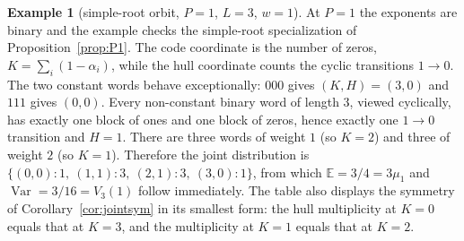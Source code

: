 \documentclass[10pt,journal,draftclsnofoot,onecolumn]{IEEEtran}
\theoremstyle{definition}
\newtheorem{example}[theorem]{Example}
\theoremstyle{remark}
\newcommand{\E}{\mathbb{E}}
\begin{document}
\begin{example}[simple-root orbit, \(P=1\), \(L=3\), \(w=1\)]\label{ex:E2}
At \(P=1\) the exponents are binary and the example checks the
simple-root specialization of Proposition~\ref{prop:P1}. The code
coordinate is the number of zeros, \(K = \sum_i (1-\alpha_i)\), while
the hull coordinate counts the cyclic transitions \(1 \to 0\). The
two constant words behave exceptionally: \(000\) gives \((K,H) =
(3,0)\) and \(111\) gives \((0,0)\). Every non-constant binary word
of length \(3\), viewed cyclically, has exactly one block of ones and
one block of zeros, hence exactly one \(1 \to 0\) transition and
\(H = 1\). There are three words of weight \(1\) (so \(K=2\)) and
three of weight \(2\) (so \(K=1\)). Therefore the joint distribution
is
\(\{(0,0):1,\ (1,1):3,\ (2,1):3,\ (3,0):1\}\), from which
\(\E = 3/4 = 3\mu_1\) and
\(\operatorname{Var} = 3/16 = V_3(1)\) follow immediately. The table
also displays the symmetry of Corollary~\ref{cor:jointsym} in its
smallest form: the hull multiplicity at \(K=0\) equals that at
\(K=3\), and the multiplicity at \(K=1\) equals that at \(K=2\).
\end{example}
\end{document}
